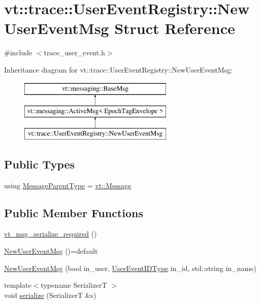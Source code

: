 \hypertarget{structvt_1_1trace_1_1_user_event_registry_1_1_new_user_event_msg}{}\section{vt\+:\+:trace\+:\+:User\+Event\+Registry\+:\+:New\+User\+Event\+Msg Struct Reference}
\label{structvt_1_1trace_1_1_user_event_registry_1_1_new_user_event_msg}


{\ttfamily \#include $<$trace\+\_\+user\+\_\+event.\+h$>$}

Inheritance diagram for vt\+:\+:trace\+:\+:User\+Event\+Registry\+:\+:New\+User\+Event\+Msg\+:\begin{figure}[H]
\begin{center}
\leavevmode
\includegraphics[height=3.000000cm]{structvt_1_1trace_1_1_user_event_registry_1_1_new_user_event_msg}
\end{center}
\end{figure}
\subsection*{Public Types}
\begin{DoxyCompactItemize}
\item 
using \hyperlink{structvt_1_1trace_1_1_user_event_registry_1_1_new_user_event_msg_afbb15e38d855c994e71f19e77194eda7}{Message\+Parent\+Type} = \hyperlink{namespacevt_a3a3ddfef40b4c90915fa43cdd5f129ea}{vt\+::\+Message}
\end{DoxyCompactItemize}
\subsection*{Public Member Functions}
\begin{DoxyCompactItemize}
\item 
\hyperlink{structvt_1_1trace_1_1_user_event_registry_1_1_new_user_event_msg_ae40defe6e5d079b0b0552558726990c1}{vt\+\_\+msg\+\_\+serialize\+\_\+required} ()
\item 
\hyperlink{structvt_1_1trace_1_1_user_event_registry_1_1_new_user_event_msg_a971f584b592c65f34216ce228eeb9d9a}{New\+User\+Event\+Msg} ()=default
\item 
\hyperlink{structvt_1_1trace_1_1_user_event_registry_1_1_new_user_event_msg_aaf57bf569ab47f0526956ab05478668f}{New\+User\+Event\+Msg} (bool in\+\_\+user, \hyperlink{namespacevt_1_1trace_a5908920d051c144c89f17c69ed262350}{User\+Event\+I\+D\+Type} in\+\_\+id, std\+::string in\+\_\+name)
\item 
{\footnotesize template$<$typename SerializerT $>$ }\\void \hyperlink{structvt_1_1trace_1_1_user_event_registry_1_1_new_user_event_msg_a3c95e7e198bfff9a4ac61e31f0863986}{serialize} (SerializerT \&s)
\end{DoxyCompactItemize}
